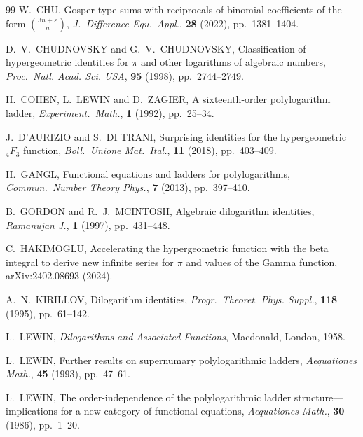 \documentclass[12pt]{article}
\begin{document}
\begin{thebibliography}{99}
 W.\ CHU, 
 Gosper-type sums with reciprocals of binomial coefficients of the form {$\binom{3n+\varepsilon}{n}$}, 
 \textit{J.\ Difference Equ.\ Appl.}, \textbf{28} (2022), pp.\ 1381--1404. 

 D.\ V.\ CHUDNOVSKY and G.\ V.\ CHUDNOVSKY, 
 Classification of hypergeometric identities for {$\pi$} and other logarithms of algebraic numbers, 
 \textit{Proc.\ Natl. Acad. Sci. USA}, \textbf{95} (1998), pp.\ 2744--2749. 

 H.\ COHEN, L.\ LEWIN and D.\ ZAGIER, 
 A sixteenth-order polylogarithm ladder, 
 \textit{Experiment.\ Math.}, \textbf{1} (1992), pp.\ 25--34. 

 J.\ D'AURIZIO and S.\ DI TRANI, 
 Surprising identities for the hypergeometric {$_4F_3$} function, 
 \textit{Boll.\ Unione Mat.\ Ital.}, \textbf{11} (2018), pp.\ 403--409. 

 H.\ GANGL, 
 Functional equations and ladders for polylogarithms, 
 \textit{Commun.\ Number Theory Phys.}, \textbf{7} (2013), pp.\ 397--410. 

 B.\ GORDON and R.\ J.\ MCINTOSH, 
 Algebraic dilogarithm identities, 
 \textit{Ramanujan J.}, \textbf{1} (1997), pp.\ 431--448. 

 C.\ HAKIMOGLU, 
 Accelerating the hypergeometric function with the beta integral to derive
 new infinite series for $\pi$ and values of the Gamma function, 
 arXiv:2402.08693 (2024). 

 A.\ N.\ KIRILLOV, 
 Dilogarithm identities, 
 \textit{Progr.\ Theoret. Phys. Suppl.}, \textbf{118} (1995), pp.\ 61--142. 

 L.\ LEWIN, 
 \textit{Dilogarithms and Associated Functions}, 
 Macdonald, London, 1958. 

 L.\ LEWIN, 
 Further results on supernumary polylogarithmic ladders, 
 \textit{Aequationes Math.}, \textbf{45} (1993), pp.\ 47--61. 

 L.\ LEWIN, 
 The order-independence of the polylogarithmic ladder structure---implications for a new category 
 of functional equations, 
 \textit{Aequationes Math.}, \textbf{30} (1986), pp.\ 1--20. 


\end{thebibliography}
\end{document}
